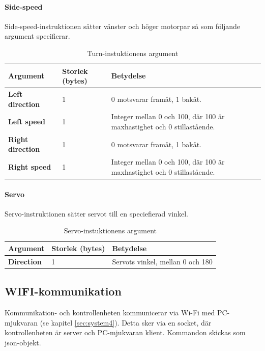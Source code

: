 \documentclass[a4paper,11pt]{article}
\begin{document}
\paragraph{Side-speed}
Side-speed-instruktionen sätter vänster och höger motorpar så som följande argument specifierar.
\begin{table}[h!]
    \centering
    \begin{tabular}{|l|l|l|}
    	\hline
    	Argument                 & Storlek (bytes) & Betydelse                                                              \\ \hline
    	\textbf{Left direction}  & 1               & 0 motsvarar framåt, 1 bakåt.                                           \\
    	\textbf{Left speed}      & 1               & Integer mellan 0 och 100, där 100 är maxhastighet och 0 stillastående. \\
    	\textbf{Right direction} & 1               & 0 motsvarar framåt, 1 bakåt.                                           \\
    	\textbf{Right speed}      & 1               & Integer mellan 0 och 100, där 100 är maxhastighet och 0 stillastående. \\ \hline
    \end{tabular}
    \caption{Turn-instuktionens argument}
\end{table}


\paragraph{Servo}
Servo-instruktionen sätter servot till en speciefierad vinkel.
\begin{table}[h!]
    \centering
    \begin{tabular}{|l|l|l|}
    	\hline
    	Argument           & Storlek (bytes) & Betydelse                        \\ \hline
    	\textbf{Direction} & 1               & Servots vinkel, mellan 0 och 180 \\ \hline
    \end{tabular}
    \caption{Servo-instuktionens argument}
\end{table}

\subsection{WIFI-kommunikation}
Kommunikation- och kontrollenheten kommunicerar via Wi-Fi med PC-mjukvaran (se kapitel \ref{sec:system4}). Detta sker via en socket, där kontrollenheten är server och PC-mjukvaran klient. Kommandon skickas som json-objekt.
\end{document}
